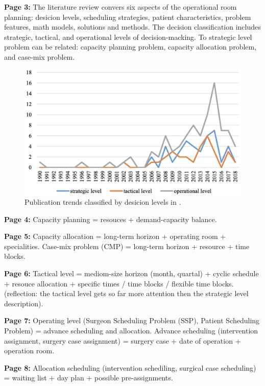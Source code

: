     \textbf{Page 3:}
    The literature review convers six aspects of the operational room planning: desicion levels, scheduling strategies, patient characteristics, problem features, math models, solutions and methods. The decision classification includes strategic, tactical, and operational levels of decision-macking. To strategic level problem can be related: capacity planning problem, capacity allocation problem, and case-mix problem.
    \begin{figure}[H]
        \centering
        \includegraphics[width=1\textwidth]{figures/0013_SR01CN19/fig2.png}
        \caption{Publication trends classified by desicion levels in \cite{x203}.}
        \label{fig2:0013_SR01CN19}
    \end{figure}

    \textbf{Page 4:}
    Capacity planning = resouces + demand-capacity balance.
    
    \textbf{Page 5:}
    Capacity allocation = long-term horizon + operating room + specialities.
    Case-mix problem (CMP) = long-term horizon + resource  + time blocks.
    
    \textbf{Page 6:}
    Tactical level = mediom-size horizon (month, quartal) + cyclic schedule + resouce allocation + specific times / time blocks / flexible time blocks. (reflection: the tactical level gets so far more attention then the strategic level description).
    
    \textbf{Page 7:}
    Operating level (Surgeon Scheduling Problem (SSP), Patient Scheduling Problem) = advance scheduling and allocation. Advance scheduling (intervention assignment, surgery case assignment) = surgery case + date of operation + operation room. 
    
    \textbf{Page 8:}
    Allocation scheduling (intervention schediling, surgical case scheduling) = waiting list + day plan + possible pre-assignments.   
    
